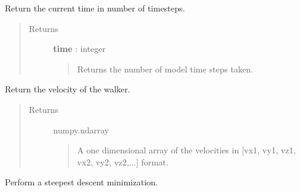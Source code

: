 \documentclass[letterpaper,10pt,english]{sphinxmanual}
\begin{document}
\begin{fulllineitems}
\begin{fulllineitems}
\begin{quote}
\begin{description}
\end{description}\end{quote}

\end{fulllineitems}


\begin{fulllineitems}
\label{walker_api/walker_api.doc:walker_api.lammps_walker.Lammps.get_time}
Return the current time in number of timesteps.
\begin{quote}\begin{description}
\item[{Returns}] \leavevmode
\textbf{time} : integer
\begin{quote}

Returns the number of model time steps taken.
\end{quote}

\end{description}\end{quote}

\end{fulllineitems}


\begin{fulllineitems}
\label{walker_api/walker_api.doc:walker_api.lammps_walker.Lammps.get_velocity}
Return the velocity of the walker.
\begin{quote}\begin{description}
\item[{Returns}] \leavevmode
numpy.ndarray
\begin{quote}

A one dimensional array of the velocities in {[}vx1, vy1, vz1, vx2, vy2, vz2,...{]} format.
\end{quote}

\end{description}\end{quote}

\end{fulllineitems}


\begin{fulllineitems}
\label{walker_api/walker_api.doc:walker_api.lammps_walker.Lammps.minimize}
Perform a steepest descent minimization.


\end{fulllineitems}
\end{fulllineitems}
\end{document}
